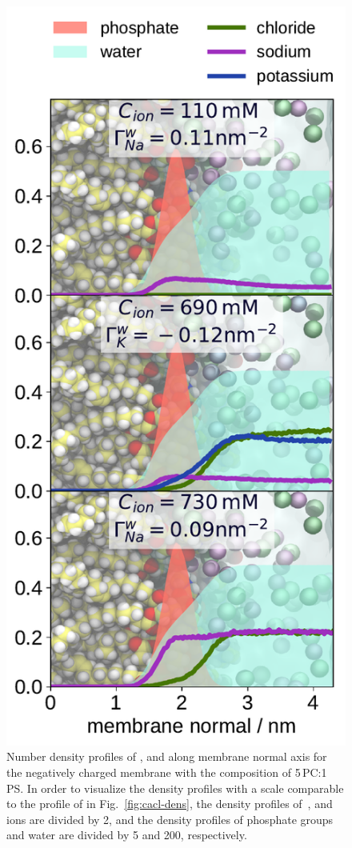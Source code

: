 \begin{figure}[tbp!] 
  \centering 
  \includegraphics[width=\figwidth]{../img/ecc_pops/density_profiles_na_k_cl_wat_phos_models-compar_4-6_NaCl-and-KCl-series.pdf}
  \caption{\label{fig:nacl-dens_PCPS} 
    Number density profiles of ,  and  along membrane normal axis 
    for the negatively charged membrane with the composition of 5\,PC:1\,PS. 
    In order to visualize the density profiles with a scale comparable to the profile of  in Fig.~\ref{fig:cacl-dens},  
    the density profiles of~,  and  ions are divided by 2, and 
    the density profiles of phosphate groups and water are divided by 5 and 200, respectively.  
    } 
\end{figure} 



